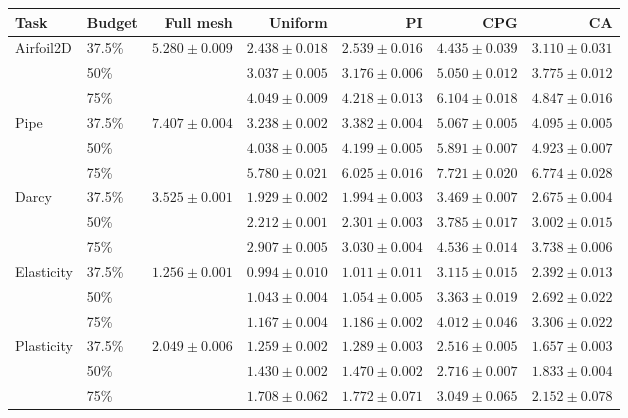 \begin{table}[!ht]
\centering
\begingroup
\footnotesize
\setlength{\tabcolsep}{3.0pt}
\renewcommand{\arraystretch}{1.08}
\begin{tabular}{llrrrrr}
\toprule
Task & Budget & Full mesh & Uniform & PI & CPG & CA \\
\midrule
Airfoil2D & 37.5\% & $5.280\!\pm\!0.009$ & $2.438\!\pm\!0.018$ & $2.539\!\pm\!0.016$ & $4.435\!\pm\!0.039$ & $3.110\!\pm\!0.031$ \\
 & 50\% &  & $3.037\!\pm\!0.005$ & $3.176\!\pm\!0.006$ & $5.050\!\pm\!0.012$ & $3.775\!\pm\!0.012$ \\
 & 75\% &  & $4.049\!\pm\!0.009$ & $4.218\!\pm\!0.013$ & $6.104\!\pm\!0.018$ & $4.847\!\pm\!0.016$ \\
\addlinespace[2pt]
Pipe & 37.5\% & $7.407\!\pm\!0.004$ & $3.238\!\pm\!0.002$ & $3.382\!\pm\!0.004$ & $5.067\!\pm\!0.005$ & $4.095\!\pm\!0.005$ \\
 & 50\% &  & $4.038\!\pm\!0.005$ & $4.199\!\pm\!0.005$ & $5.891\!\pm\!0.007$ & $4.923\!\pm\!0.007$ \\
 & 75\% &  & $5.780\!\pm\!0.021$ & $6.025\!\pm\!0.016$ & $7.721\!\pm\!0.020$ & $6.774\!\pm\!0.028$ \\
\addlinespace[2pt]
Darcy & 37.5\% & $3.525\!\pm\!0.001$ & $1.929\!\pm\!0.002$ & $1.994\!\pm\!0.003$ & $3.469\!\pm\!0.007$ & $2.675\!\pm\!0.004$ \\
 & 50\% &  & $2.212\!\pm\!0.001$ & $2.301\!\pm\!0.003$ & $3.785\!\pm\!0.017$ & $3.002\!\pm\!0.015$ \\
 & 75\% &  & $2.907\!\pm\!0.005$ & $3.030\!\pm\!0.004$ & $4.536\!\pm\!0.014$ & $3.738\!\pm\!0.006$ \\
\addlinespace[2pt]
Elasticity & 37.5\% & $1.256\!\pm\!0.001$ & $0.994\!\pm\!0.010$ & $1.011\!\pm\!0.011$ & $3.115\!\pm\!0.015$ & $2.392\!\pm\!0.013$ \\
 & 50\% &  & $1.043\!\pm\!0.004$ & $1.054\!\pm\!0.005$ & $3.363\!\pm\!0.019$ & $2.692\!\pm\!0.022$ \\
 & 75\% &  & $1.167\!\pm\!0.004$ & $1.186\!\pm\!0.002$ & $4.012\!\pm\!0.046$ & $3.306\!\pm\!0.022$ \\
\addlinespace[2pt]
Plasticity & 37.5\% & $2.049\!\pm\!0.006$ & $1.259\!\pm\!0.002$ & $1.289\!\pm\!0.003$ & $2.516\!\pm\!0.005$ & $1.657\!\pm\!0.003$ \\
 & 50\% &  & $1.430\!\pm\!0.002$ & $1.470\!\pm\!0.002$ & $2.716\!\pm\!0.007$ & $1.833\!\pm\!0.004$ \\
 & 75\% &  & $1.708\!\pm\!0.062$ & $1.772\!\pm\!0.071$ & $3.049\!\pm\!0.065$ & $2.152\!\pm\!0.078$ \\

\end{tabular}
\end{table}

